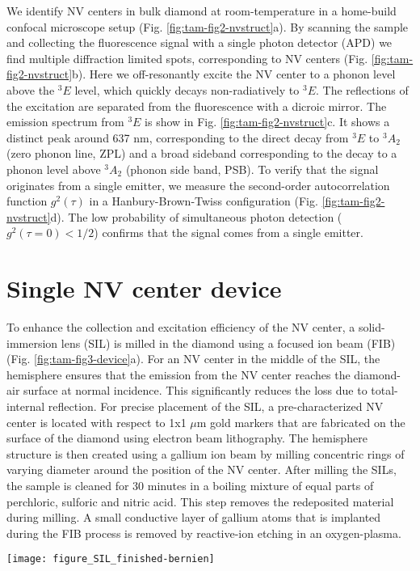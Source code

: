 We identify NV centers in bulk diamond at room-temperature in a home-build confocal microscope setup (Fig. \ref{fig:tam-fig2-nvstruct}a). By scanning the sample and collecting the fluorescence signal with a single photon detector (APD) we find multiple diffraction limited spots, corresponding to NV centers (Fig. \ref{fig:tam-fig2-nvstruct}b). Here we off-resonantly excite the NV center to a phonon level above the $^3E$ level, which quickly decays non-radiatively to $^3E$. The reflections of the excitation are separated from the fluorescence with a dicroic mirror. The emission spectrum from $^3E$ is show in Fig. \ref{fig:tam-fig2-nvstruct}c. It shows a distinct peak around 637 nm, corresponding to the direct decay from $^3E$ to $^3A_2$ (zero phonon line, ZPL) and a broad sideband corresponding to the decay to a phonon level above $^3A_2$ (phonon side band, PSB). To verify that the signal originates from a single emitter, we measure the second-order autocorrelation function $g^2 (\tau)$ in a Hanbury-Brown-Twiss configuration (Fig. \ref{fig:tam-fig2-nvstruct}d). The low probability of simultaneous photon detection ($g^2 (\tau = 0) < 1/2$) confirms that the signal comes from a single emitter.

\section{Single NV center device}

To enhance the collection and excitation efficiency of the NV center, a solid-immersion lens (SIL) is milled in the diamond using a focused ion beam (FIB) \cite{Hadden__2010,Marseglia__2011,Bernien__2014,Jamali__2014} (Fig. \ref{fig:tam-fig3-device}a). For an NV center in the middle of the SIL, the hemisphere ensures that the emission from the NV center reaches the diamond-air surface at normal incidence. This significantly reduces the loss due to total-internal reflection. For precise placement of the SIL, a pre-characterized NV center is located with respect to 1x1 $\mu$m gold markers that are fabricated on the surface of the diamond using electron beam lithography. The hemisphere structure is then created using a gallium ion beam by milling concentric rings of varying diameter around the position of the NV center. After milling the SILs, the sample is cleaned for 30 minutes in a boiling mixture of equal parts of perchloric, sulforic and nitric acid. This step removes the redeposited material during milling. A small conductive layer of gallium atoms that is implanted during the FIB process is removed by reactive-ion etching in an oxygen-plasma. 
\label{sec:devices}
\begin{figure*}
	\centering
	\texttt{[image: figure\_SIL\_finished-bernien]}
	\caption{\label{fig:tam-fig3-device} \textbf{} Figure from \cite{Bernien__2014} (a) }
\end{figure*}

